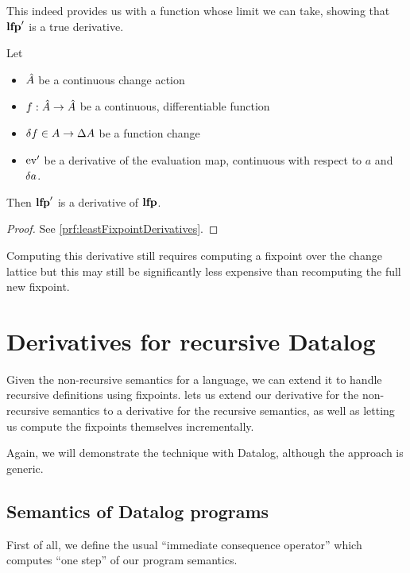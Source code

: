 This indeed provides us with a function whose limit we can take, showing
that $\mathbf{lfp}'$ is a true derivative.

\begin{thm}[name=Derivatives of least fixpoint operators, restate=leastFixpointDerivatives]
  \label{thm:leastFixpointDerivatives}
  Let
  \begin{itemize}
    \item $\hat{A}$ be a continuous change action
    \item $f : \hat{A} \rightarrow \hat{A}$ be a continuous, differentiable function
    \item $\delta f \in A \rightarrow \Delta A$ be a function change
    \item $\operatorname{ev}'$ be a derivative of the evaluation map, continuous with
      respect to $a$ and $\delta a$.
  \end{itemize}
  Then $\mathbf{lfp}'$ is a derivative of $\mathbf{lfp}$.
\end{thm}
\ifproofs
\begin{proof}
  See \cref{prf:leastFixpointDerivatives}.
\end{proof}
\fi

Computing this derivative still requires computing a fixpoint \textemdash{} over the change
lattice \textemdash{} but this may still be significantly less expensive than
recomputing the full new fixpoint.

\section{Derivatives for recursive Datalog}
\label{sec:recursiveDatalog}

Given the non-recursive semantics for a language, we can extend it to handle
recursive definitions using fixpoints.  lets us extend our
derivative for the non-recursive semantics to a derivative for the recursive
semantics, as well as letting us compute the fixpoints themselves
incrementally. 

Again, we will demonstrate the technique with Datalog, although the approach is generic.

\subsection{Semantics of Datalog programs}

First of all, we define the usual ``immediate consequence operator'' which
computes ``one step'' of our program semantics.

